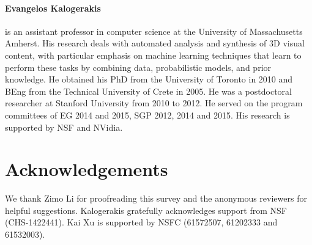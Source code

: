 
\paragraph*{Evangelos Kalogerakis} is an assistant professor in computer science at the University of Massachusetts Amherst. His research deals with automated analysis and synthesis of 3D visual content, with particular emphasis on machine learning techniques that learn to perform these tasks by combining data, probabilistic models, and prior knowledge. He obtained his PhD from the University of Toronto in 2010 and BEng from the Technical University of Crete in 2005. He was a postdoctoral researcher at Stanford University from 2010 to 2012.  He served on the program committees of EG 2014 and 2015, SGP 2012, 2014 and 2015. His research is supported by NSF and NVidia.


\section*{Acknowledgements}
We thank Zimo Li for proofreading this survey and the anonymous reviewers for helpful suggestions.
Kalogerakis gratefully acknowledges support from NSF (CHS-1422441).
Kai Xu is supported by NSFC (61572507, 61202333 and 61532003).
